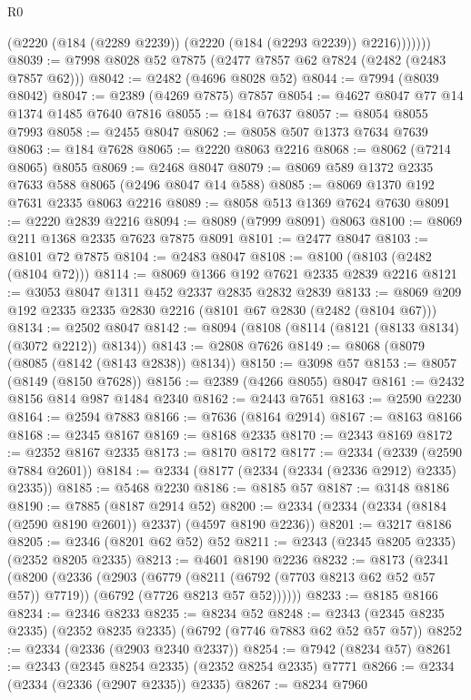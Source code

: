 \begin{lexlean}{R0}
\begin{coremodule}
              (@2220 (@184 (@2289 @2239)) (@2220 (@184 (@2293 @2239)) @2216)))))))
@8039 := @7998 @8028 @52 @7875 (@2477 @7857 @62 @7824 (@2482 (@2483 @7857 @62)))
@8042 := @2482 (@4696 @8028 @52)
@8044 := @7994 (@8039 @8042)
@8047 := @2389 (@4269 @7875) @7857
@8054 := @4627 @8047 @77 @14 @1374 @1485 @7640 @7816
@8055 := @184 @7637
@8057 := @8054 @8055 @7993
@8058 := @2455 @8047
@8062 := @8058 @507 @1373 @7634 @7639
@8063 := @184 @7628
@8065 := @2220 @8063 @2216
@8068 := @8062 (@7214 @8065) @8055
@8069 := @2468 @8047
@8079 := @8069 @589 @1372 @2335 @7633 @588 @8065 (@2496 @8047 @14 @588)
@8085 := @8069 @1370 @192 @7631 @2335 @8063 @2216
@8089 := @8058 @513 @1369 @7624 @7630
@8091 := @2220 @2839 @2216
@8094 := @8089 (@7999 @8091) @8063
@8100 := @8069 @211 @1368 @2335 @7623 @7875 @8091
@8101 := @2477 @8047
@8103 := @8101 @72 @7875
@8104 := @2483 @8047
@8108 := @8100 (@8103 (@2482 (@8104 @72)))
@8114 := @8069 @1366 @192 @7621 @2335 @2839 @2216
@8121 := @3053 @8047 @1311 @452 @2337 @2835 @2832 @2839
@8133 := @8069 @209 @192 @2335 @2335 @2830 @2216 (@8101 @67 @2830 (@2482 (@8104 @67)))
@8134 := @2502 @8047
@8142 := @8094 (@8108 (@8114 (@8121 (@8133 @8134) (@3072 @2212)) @8134))
@8143 := @2808 @7626
@8149 := @8068 (@8079 (@8085 (@8142 (@8143 @2838)) @8134))
@8150 := @3098 @57
@8153 := @8057 (@8149 (@8150 @7628))
@8156 := @2389 (@4266 @8055) @8047
@8161 := @2432 @8156 @814 @987 @1484 @2340
@8162 := @2443 @7651
@8163 := @2590 @2230
@8164 := @2594 @7883
@8166 := @7636 (@8164 @2914)
@8167 := @8163 @8166
@8168 := @2345 @8167
@8169 := @8168 @2335
@8170 := @2343 @8169
@8172 := @2352 @8167 @2335
@8173 := @8170 @8172
@8177 := @2334 (@2339 (@2590 @7884 @2601))
@8184 := @2334 (@8177 (@2334 (@2334 (@2336 @2912) @2335) @2335))
@8185 := @5468 @2230
@8186 := @8185 @57
@8187 := @3148 @8186
@8190 := @7885 (@8187 @2914 @52)
@8200 := @2334 (@2334 (@2334 (@8184 (@2590 @8190 @2601)) @2337) (@4597 @8190 @2236))
@8201 := @3217 @8186
@8205 := @2346 (@8201 @62 @52) @52
@8211 := @2343 (@2345 @8205 @2335) (@2352 @8205 @2335)
@8213 := @4601 @8190 @2236
@8232 := @8173
    (@2341
      (@8200
        (@2336
          (@2903
            (@6779 (@8211 (@6792 (@7703 @8213 @62 @52 @57 @57)) @7719))
            (@6792 (@7726 @8213 @57 @52))))))
@8233 := @8185 @8166
@8234 := @2346 @8233
@8235 := @8234 @52
@8248 := @2343 (@2345 @8235 @2335) (@2352 @8235 @2335) (@6792 (@7746 @7883 @62 @52 @57 @57))
@8252 := @2334 (@2336 (@2903 @2340 @2337))
@8254 := @7942 (@8234 @57)
@8261 := @2343 (@2345 @8254 @2335) (@2352 @8254 @2335) @7771
@8266 := @2334 (@2334 (@2336 (@2907 @2335)) @2335)
@8267 := @8234 @7960

\end{coremodule}
\end{lexlean}
